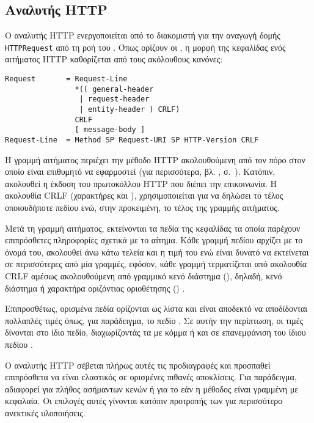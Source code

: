 \subsection{Αναλυτής HTTP}
\label{subsec:network:http-parser}

Ο αναλυτής HTTP ενεργοποιείται από το διακομιστή για την αναγωγή δομής
\verb~HTTPRequest~ από τη ροή του . Όπως ορίζουν οι
\textcite[35]{rfc2616}, η μορφή της κεφαλίδας ενός αιτήματος HTTP καθορίζεται
από τους ακόλουθους κανόνες:
\begin{lstlisting}
Request       = Request-Line
                *(( general-header
                 | request-header
                 | entity-header ) CRLF)
                CRLF
                [ message-body ]
Request-Line  = Method SP Request-URI SP HTTP-Version CRLF
\end{lstlisting}

Η γραμμή αιτήματος περιέχει την μέθοδο HTTP ακολουθούμενη από τον πόρο στον
οποίο είναι επιθυμητό να εφαρμοστεί (για περισσότερα,
βλ. ,
σ.~\pageref{ssubsec:network:resource-general}). Κατόπιν, ακολουθεί η έκδοση του
πρωτοκόλλου HTTP που διέπει την επικοινωνία. Η ακολουθία CRLF (χαρακτήρες
 και ), χρησιμοποιείται για να δηλώσει το
τέλος οποιουδήποτε πεδίου ενώ, στην προκειμένη, το τέλος της γραμμής αιτήματος.

Μετά τη γραμμή αιτήματος, εκτείνονται τα πεδία της κεφαλίδας τα οποία παρέχουν
επιπρόσθετες πληροφορίες σχετικά με το αίτημα. Κάθε γραμμή πεδίου αρχίζει με το
όνομά του, ακολουθεί άνω κάτω τελεία και η τιμή του ενώ είναι δυνατό να
εκτείνεται σε περισσότερες από μία γραμμές, εφόσον, κάθε γραμμή τερματίζεται
από ακολουθία CRLF αμέσως ακολουθούμενη από γραμμικό κενό διάστημα
(), δηλαδή, κενό διάστημα ή χαρακτήρα οριζόντιας
οριοθέτησης () \parencite[31--32]{rfc2616}.

Επιπροσθέτως, ορισμένα πεδία ορίζονται ως λίστα και είναι αποδεκτό να
αποδίδονται πολλαπλές τιμές όπως, για παράδειγμα, το πεδίο 
\parencite[32,100]{rfc2616}. Σε αυτήν την περίπτωση, οι τιμές δίνονται στο ίδιο
πεδίο, διαχωρίζοντάς τα με κόμμα ή και σε επανεμφάνιση του ίδιου πεδίου
\parencite[32]{rfc2616}.


Ο αναλυτής HTTP σέβεται πλήρως αυτές τις προδιαγραφές και προσπαθεί επιπρόσθετα
να είναι ελαστικός σε ορισμένες πιθανές αποκλίσεις. Για παράδειγμα, αδιαφορεί
για πλήθος ασήμαντων κενών ή για το εάν η μέθοδος είναι γραμμένη με κεφαλαία. Οι
επιλογές αυτές γίνονται κατόπιν προτροπής των \textcite[166]{rfc2616} για
περισσότερο ανεκτικές υλοποιήσεις.


